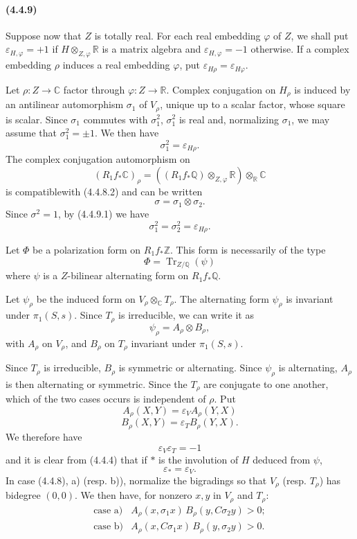 \documentclass[10pt]{article}
\newcommand{\C}{\mathbb C}
\newcommand{\Q}{\mathbb Q}
\newcommand{\Z}{\mathbb Z}
\newcommand{\fg}{\guillemotright}
\newcommand{\og}{\guillemotleft}
\newcommand{\R}{\mathbb R}
\newcommand{\Tr}{\operatorname{Tr}}
\begin{document}

\paragraph{(4.4.9)} Suppose now that $Z$ is totally real. For each real embedding $\varphi$ of $Z$, we shall put $\varepsilon_{H,\varphi}=+1$ if $H\otimes_{Z,\varphi}\R$ is a matrix algebra and $\varepsilon_{H,\varphi}=-1$ otherwise. If a complex embedding $\rho$ induces a real embedding $\varphi$, put $\varepsilon_{H\rho}=\varepsilon_{H\varphi}$.

Let $\rho:Z\to\C$ factor through $\varphi:Z\to\R$. Complex conjugation on $H_\rho$ is induced by an antilinear automorphism $\sigma_1$ of $V_\rho$, unique up to a scalar factor, whose square is scalar. Since $\sigma_1$ commutes with $\sigma_1^2$, $\sigma_1^2$ is real and, normalizing $\sigma_1$, we may assume that $\sigma_1^2=\pm1$. We then have
\[
\tag{4.4.9.1}
\sigma_1^2=\varepsilon_{H\rho}.
\]
The complex conjugation automorphism on
\[
(R_1f_*\C)_\rho=((R_1f_*\Q)\otimes_{Z,\varphi}\R)\otimes_\R\C
\]
is \og compatible\fg with (4.4.8.2) and can be written
\[
\sigma=\sigma_1\otimes\sigma_2.
\]
Since $\sigma^2=1$, by (4.4.9.1) we have
\[
\tag{4.4.9.2}
\sigma_1^2=\sigma_2^2=\varepsilon_{H\rho}.
\]

Let $\Phi$ be a polarization form on $R_1f_*\Z$. This form is necessarily of the type
\[
\Phi=\Tr_{Z/\Q}(\psi)
\]
where $\psi$ is a $Z$-bilinear alternating form on $R_1f_*\Q$.

Let $\psi_\rho$ be the induced form on $V_\rho\otimes_\C T_\rho$. The alternating form $\psi_\rho$ is invariant under $\pi_1(S,s)$. Since $T_\rho$ is irreducible, we can write it as
\[
\tag{4.4.9.3}
\psi_\rho=A_\rho\otimes B_\rho,
\]
with $A_\rho$ on $V_\rho$, and $B_\rho$ on $T_\rho$ invariant under $\pi_1(S,s)$.

Since $T_\rho$ is irreducible, $B_\rho$ is symmetric or alternating. Since $\psi_\rho$ is alternating, $A_\rho$ is then alternating or symmetric. Since the $T_\rho$ are conjugate to one another, which of the two cases occurs is independent of $\rho$. Put
\[
\tag{4.4.9.4}
A_\rho(X,Y)=\varepsilon_V A_\rho(Y,X)
\]
\[
\tag{4.4.9.5}
B_\rho(X,Y)=\varepsilon_T B_\rho(Y,X).
\]
We therefore have
\[
\tag{4.4.9.6}
\varepsilon_V\varepsilon_T=-1
\]
and it is clear from (4.4.4) that if $*$ is the involution of $H$ deduced from $\psi$,
\[
\tag{4.4.9.7}
\varepsilon_*=\varepsilon_V.
\]
In case (4.4.8), a) (resp. b)), normalize the bigradings so that $V_\rho$ (resp. $T_\rho$) has bidegree $(0,0)$. We then have, for nonzero $x,y$ in $V_\rho$ and $T_\rho$:
\[
\begin{array}{ll}
\text{case a)}& A_\rho(x,\sigma_1x)\,B_\rho(y,C\sigma_2y)>0;\\[0.3em]
\text{case b)}& A_\rho(x,C\sigma_1x)\,B_\rho(y,\sigma_2y)>0.
\end{array}
\]
\end{document}
